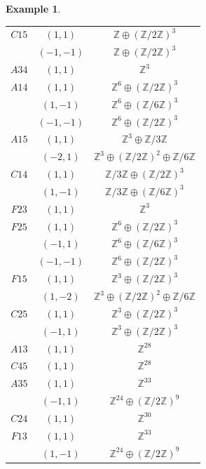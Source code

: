 \documentclass[11pt]{amsart}
\newtheorem{example}[theorem]{Example}
\theoremstyle{definition}
\newcommand{\Z}{\mathbb{Z}}
\begin{document}
\begin{example}
\begin{center}
\begin{tabular}{c|c|c}
    $C15$ & $(1,1)$ & $\Z \oplus (\Z/2\Z)^3$ \\
        & $(-1,-1)$ & $\Z \oplus (\Z/2\Z)^3$ \\
    $A34$ & $(1,1)$ & $\Z^3$ \\
    $A14$ & $(1,1)$ & $\Z^6 \oplus (\Z/2\Z)^3$ \\
    & $(1,-1)$ & $\Z^6 \oplus (\Z/6\Z)^3$ \\
    & $(-1,-1)$ & $\Z^6 \oplus (\Z/2\Z)^3$ \\
    $A15$ & $(1,1)$ & $\Z^3 \oplus \Z/3\Z$ \\ 
    & $(-2,1)$ & $\Z^3 \oplus (\Z/2\Z)^2 \oplus \Z/6\Z$ \\
        
    $C14$ & $(1,1)$ & $\Z/3\Z \oplus (\Z/2\Z)^3$ \\
        & $(1,-1)$ & $\Z/3\Z \oplus (\Z/6\Z)^3$ \\
    $F23$ & $(1,1)$ & $\Z^3$ \\
    $F25$ & $(1,1)$ & $\Z^6 \oplus (\Z/2\Z)^3$ \\
        & $(-1,1)$ & $\Z^6 \oplus (\Z/6\Z)^3$ \\
            & $(-1,-1)$ & $\Z^6 \oplus (\Z/2\Z)^3$ \\
    $F15$ & $(1,1)$ & $\Z^3 \oplus (\Z/2\Z)^3$ \\
        & $(1,-2)$ & $\Z^3 \oplus (\Z/2\Z)^2 \oplus \Z/6\Z$ \\
    $C25$ & $(1,1)$ & $\Z^3 \oplus (\Z/2\Z)^3$ \\
        & $(-1,1)$ & $\Z^3 \oplus (\Z/2\Z)^3$ \\
    $A13$ & $(1,1)$ & $\Z^{28}$ \\
    $C45$ & $(1,1)$ & $\Z^{28}$ \\
    $A35$ & $(1,1)$ & $\Z^{33}$ \\
    & $(-1,1)$ & $\Z^{24} \oplus (\Z/2\Z)^9$ \\
    $C24$ & $(1,1)$ & $\Z^{30}$ \\
    $F13$ & $(1,1)$ & $\Z^{33}$ \\ 
    & $(1,-1)$ & $\Z^{24} \oplus (\Z/2\Z)^9$ \\
\end{tabular}
\end{center}

\end{example}
\end{document}
